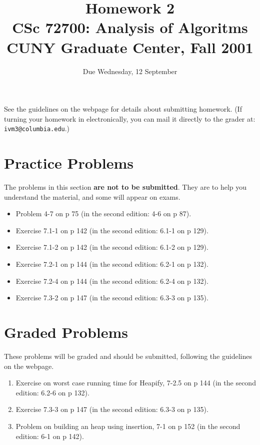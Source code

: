 \documentclass[11pt]{article}
\begin{document}
\title{Homework 2\\
       CSc 72700: Analysis of Algoritms\\
       CUNY Graduate Center, Fall 2001 }
\date{Due Wednesday, 12 September}
\author{}
\maketitle

See the guidelines on the webpage for details about submitting homework.
(If turning your homework in electronically, you can mail it directly
to the grader at: {\tt ivm3@columbia.edu}.)

\section*{Practice Problems}

The problems in this section {\bf are not to be submitted}.  They are to
help you understand the material, and some will appear on exams.

\begin{itemize}
    \item Problem 4-7 on p 75 (in the second edition: 4-6 on p 87).
    \item Exercise 7.1-1 on p 142 (in the second edition: 6.1-1 on p 129).
    \item Exercise 7.1-2 on p 142 (in the second edition: 6.1-2 on p 129).
    \item Exercise 7.2-1 on p 144 (in the second edition: 6.2-1 on p 132).
    \item Exercise 7.2-4 on p 144 (in the second edition: 6.2-4 on p 132).
    \item Exercise 7.3-2 on p 147 (in the second edition: 6.3-3 on p 135).
    
\end{itemize}

\section*{Graded Problems}

These problems will be graded and should be submitted, following the
guidelines on the webpage.

\begin{enumerate}
    \item Exercise on worst case running time for Heapify,
	7-2.5 on p 144 (in the second edition: 6.2-6 on p 132).
    \item Exercise 7.3-3 on p 147 (in the second edition: 6.3-3 on p 135).
    \item Problem on building an heap using insertion,
	7-1 on p 152 (in the second edition: 6-1 on p 142).

\end{enumerate}
\end{document}
